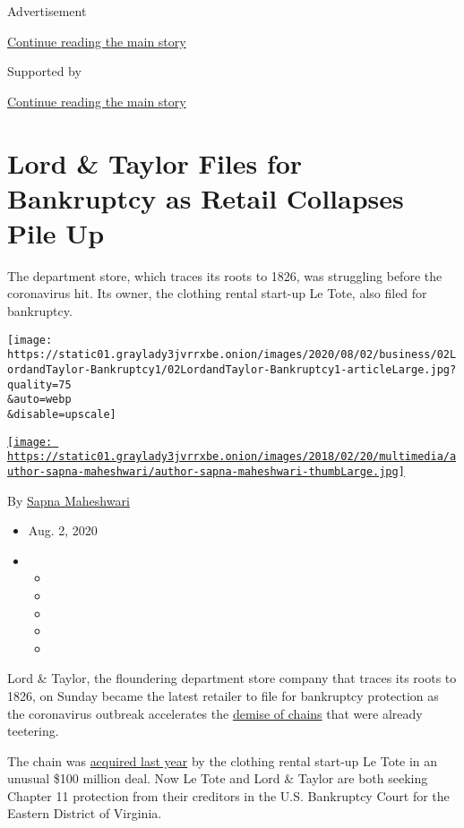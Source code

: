 Advertisement

\protect\hyperlink{after-top}{Continue reading the main story}

Supported by

\protect\hyperlink{after-sponsor}{Continue reading the main story}

\hypertarget{lord--taylor-files-for-bankruptcy-as-retail-collapses-pile-up}{%
\section{Lord \& Taylor Files for Bankruptcy as Retail Collapses Pile
Up}\label{lord--taylor-files-for-bankruptcy-as-retail-collapses-pile-up}}

The department store, which traces its roots to 1826, was struggling
before the coronavirus hit. Its owner, the clothing rental start-up Le
Tote, also filed for bankruptcy.

\texttt{[image: https://static01.graylady3jvrrxbe.onion/images/2020/08/02/business/02LordandTaylor-Bankruptcy1/02LordandTaylor-Bankruptcy1-articleLarge.jpg?quality=75\\\&auto=webp\\\&disable=upscale]}

\href{https://www.nytimes3xbfgragh.onion/by/sapna-maheshwari}{\texttt{[image: https://static01.graylady3jvrrxbe.onion/images/2018/02/20/multimedia/author-sapna-maheshwari/author-sapna-maheshwari-thumbLarge.jpg]}}

By \href{https://www.nytimes3xbfgragh.onion/by/sapna-maheshwari}{Sapna
Maheshwari}

\begin{itemize}
\item
  Aug. 2, 2020
\item
  \begin{itemize}
  \item
  \item
  \item
  \item
  \item
  \end{itemize}
\end{itemize}

Lord \& Taylor, the floundering department store company that traces its
roots to 1826, on Sunday became the latest retailer to file for
bankruptcy protection as the coronavirus outbreak accelerates the
\href{https://www.nytimes3xbfgragh.onion/2020/04/21/business/coronavirus-department-stores-neiman-marcus.html}{demise
of chains} that were already teetering.

The chain was
\href{https://www.nytimes3xbfgragh.onion/2019/08/28/business/lord-taylor-sold-le-tote.html}{acquired
last year} by the clothing rental start-up Le Tote in an unusual \$100
million deal. Now Le Tote and Lord \& Taylor are both seeking Chapter 11
protection from their creditors in the U.S. Bankruptcy Court for the
Eastern District of Virginia.

